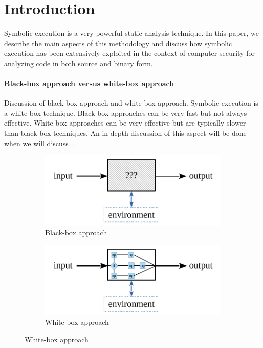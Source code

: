 
\section{Introduction}

Symbolic execution is a very powerful static analysis technique. In this paper, we describe the main aspects of this methodology and discuss how symbolic execution has been extensively exploited in the context of computer security for analyzing code in both source and binary form.

\paragraph{Black-box approach versus white-box approach}

Discussion of black-box approach and white-box approach. Symbolic execution is a white-box technique. Black-box approaches can be very fast but not always effective. White-box approaches can be very effective but are typically slower than black-box techniques. An in-depth discussion of this aspect will be done when we will discuss~\cite{DRILLER-NDSS16}.

\begin{figure}[H]
  \vspace{-3mm}
  \centering
  \begin{subfigure}{.5\textwidth}
    \centering
    \includegraphics[width=0.9\linewidth]{images/blackbox} 
    \caption{Black-box approach}
  \end{subfigure}%
  \begin{subfigure}{.5\textwidth}
    \centering
    \includegraphics[width=0.9\linewidth]{images/whitebox} 
    \caption{White-box approach}
  \end{subfigure}
  \vspace{-3mm}
\end{figure}
